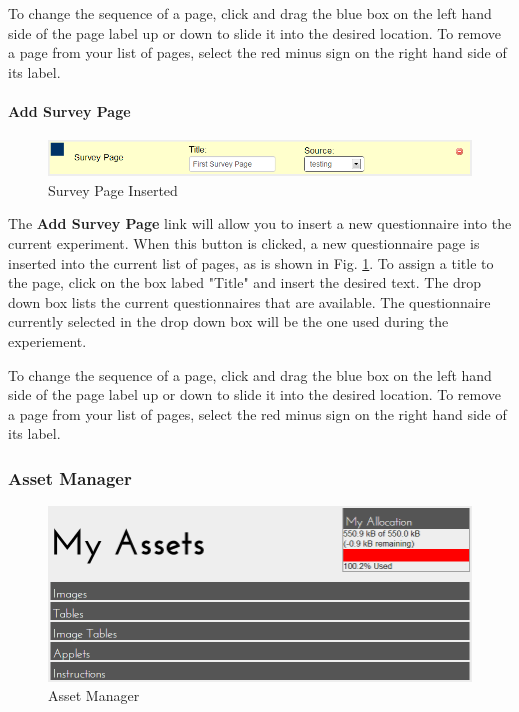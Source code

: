 \documentclass[article]{ij4uq}              %
\begin{document}
To change the sequence of a page, click and drag the blue box on the left hand side of the page label up or down to slide it into the desired location. To remove a page from your list of pages, select the red minus sign on the right hand side of its label.

\paragraph{Add Survey Page}

\begin{figure}[h!]
 \centering
 \includegraphics[width=5.0in]{figures/add_survey.png}
 \caption{Survey Page Inserted}
 \label{fig:surveyInsert}
\end{figure}
\FloatBarrier

The \textbf{Add Survey Page} link will allow you to insert a new questionnaire into the current experiment. When this button is clicked, a new questionnaire page is inserted into the current list of pages, as is shown in Fig. \ref{fig:surveyInsert}.   To assign a title to the page, click on the box labed "Title" and insert the desired text.  The drop down box lists the current questionnaires  that are available.  The questionnaire currently selected in the drop down box will be the one used during the experiement.

To change the sequence of a page, click and drag the blue box on the left hand side of the page label up or down to slide it into the desired location. To remove a page from your list of pages, select the red minus sign on the right hand side of its label.

\subsubsection {Asset Manager}

\begin{figure}[h!]
 \centering
 \includegraphics[width=5.0in]{figures/manage_assets.png}
 \caption{Asset Manager}
 \label{fig:manageAsset}
\end{figure}
\FloatBarrier
\end{document}
